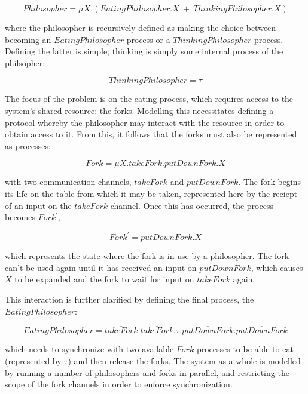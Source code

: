 \begin{equation}
Philosopher = \mu X.(EatingPhilosopher.X\ +\ ThinkingPhilosopher.X)
\end{equation}

\noindent where the philosopher is recursively defined as making the
choice between becoming an $EatingPhilosopher$ process or a
$ThinkingPhilosopher$ process.  Defining the latter is simple; 
thinking is simply some internal process of the philsopher:

\begin{equation}
ThinkingPhilosopher = \tau
\end{equation}

The focus of the problem is on the eating process, which requires
access to the system's shared resource: the forks.  Modelling this
necessitates defining a protocol whereby the philosopher may interact
with the resource in order to obtain access to it.  From this, it
follows that the forks must also be represented as processes:

\begin{equation}
Fork = \mu X.takeFork.putDownFork.X
\end{equation}

\noindent with two communication channels, $takeFork$ and
$putDownFork$.  The fork begins its life on the table from which it
may be taken, represented here by the reciept of an input on the
$takeFork$ channel.  Once this has occurred, the process becomes
$Fork^\prime$,

\begin{equation}
Fork^\prime = putDownFork.X
\end{equation}

\noindent which represents the state where the fork is in use by a
philosopher.  The fork can't be used again until it has received an
input on $putDownFork$, which causes $X$ to be expanded and the fork to
wait for input on $takeFork$ again.

This interaction is further clarified by defining the final process,
the $EatingPhilosopher$:

\begin{equation}
EatingPhilosopher = \overline{takeFork}.\overline{takeFork}.\tau.\overline{putDownFork}.\overline{putDownFork}
\end{equation}

\noindent which needs to synchronize with two available $Fork$
processes to be able to eat (represented by $\tau$) and then release
the forks.  The system as a whole is modelled by running a number of
philosophers and forks in parallel, and restricting the scope of the
fork channels in order to enforce synchronization.

